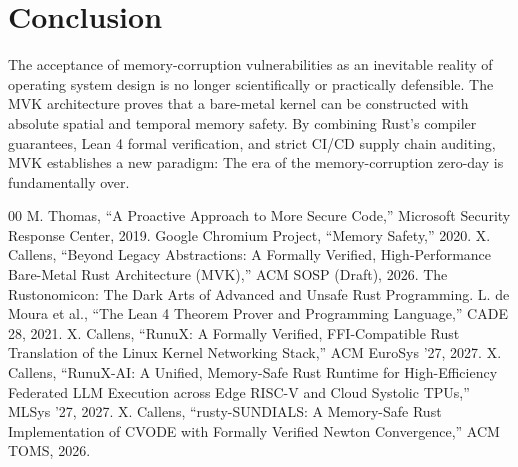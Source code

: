 \documentclass[conference]{IEEEtran}
\begin{document}
\section{Conclusion}
The acceptance of memory-corruption vulnerabilities as an inevitable reality of operating system design is no longer scientifically or practically defensible. The MVK architecture proves that a bare-metal kernel can be constructed with absolute spatial and temporal memory safety. By combining Rust's compiler guarantees, Lean 4 formal verification, and strict CI/CD supply chain auditing, MVK establishes a new paradigm: The era of the memory-corruption zero-day is fundamentally over.

\begin{thebibliography}{00}
 M. Thomas, ``A Proactive Approach to More Secure Code,'' Microsoft Security Response Center, 2019.
 Google Chromium Project, ``Memory Safety,'' 2020.
 X. Callens, ``Beyond Legacy Abstractions: A Formally Verified, High-Performance Bare-Metal Rust Architecture (MVK),'' ACM SOSP (Draft), 2026.
 The Rustonomicon: The Dark Arts of Advanced and Unsafe Rust Programming.
 L. de Moura et al., ``The Lean 4 Theorem Prover and Programming Language,'' CADE 28, 2021.
 X. Callens, ``RunuX: A Formally Verified, FFI-Compatible Rust Translation of the Linux Kernel Networking Stack,'' ACM EuroSys '27, 2027.
 X. Callens, ``RunuX-AI: A Unified, Memory-Safe Rust Runtime for High-Efficiency Federated LLM Execution across Edge RISC-V and Cloud Systolic TPUs,'' MLSys '27, 2027.
 X. Callens, ``rusty-SUNDIALS: A Memory-Safe Rust Implementation of CVODE with Formally Verified Newton Convergence,'' ACM TOMS, 2026.
\end{thebibliography}
\end{document}
